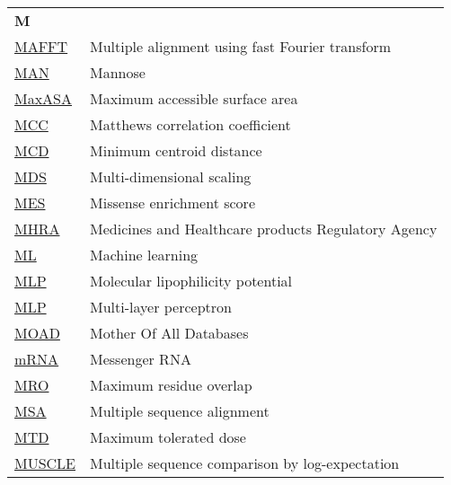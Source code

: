 \begin{longtable}[l]{@{}p{2.5cm}p{12cm}@{}}
\textbf{\large M} & \\[0.25cm]
\textmd{\href{https://en.wikipedia.org/wiki/MAFFT}{MAFFT}} & Multiple alignment using fast Fourier transform \\
\textmd{\href{https://www.ebi.ac.uk/pdbe-srv/pdbechem/chemicalCompound/show/MAN}{MAN}} & Mannose \\
\textmd{\href{https://en.wikipedia.org/wiki/Relative_accessible_surface_area}{MaxASA}} & Maximum accessible surface area \\
\textmd{\href{https://en.wikipedia.org/wiki/Phi_coefficient}{MCC}} & Matthews correlation coefficient \\
\textmd{\href{https://jcheminf.biomedcentral.com/articles/10.1186/s13321-024-00923-z}{MCD}} & Minimum centroid distance \\
\textmd{\href{https://en.wikipedia.org/wiki/Multidimensional_scaling}{MDS}} & Multi-dimensional scaling \\
\textmd{\href{https://www.nature.com/articles/s42003-024-06117-5}{MES}} & Missense enrichment score \\
\textmd{\href{https://en.wikipedia.org/wiki/Medicines_and_Healthcare_products_Regulatory_Agency}{MHRA}} & Medicines and Healthcare products Regulatory Agency \\
\textmd{\href{https://en.wikipedia.org/wiki/Machine_learning}{ML}} & Machine learning \\
\textmd{\href{https://www.cgl.ucsf.edu/chimera/data/mlp-sep2016/index.html}{MLP}} & Molecular lipophilicity potential\\
\textmd{\href{https://en.wikipedia.org/wiki/Multilayer_perceptron}{MLP}} & Multi-layer perceptron \\
\textmd{\href{https://www.nature.com/articles/s41598-023-29996-w}{MOAD}} & Mother Of All Databases \\
\textmd{\href{https://en.wikipedia.org/wiki/Messenger_RNA}{mRNA}} & Messenger RNA \\
\textmd{\href{https://jcheminf.biomedcentral.com/articles/10.1186/s13321-024-00923-z}{MRO}} & Maximum residue overlap \\
\textmd{\href{https://en.wikipedia.org/wiki/Multiple_sequence_alignment}{MSA}} & Multiple sequence alignment \\
\textmd{\href{https://en.wikipedia.org/wiki/Therapeutic_index\#Maximum_tolerated_dose}{MTD}} & Maximum tolerated dose \\
\textmd{\href{https://en.wikipedia.org/wiki/MUSCLE_(alignment_software)}{MUSCLE}} & Multiple sequence comparison by log-expectation  \\[0.3175cm]

\end{longtable}
